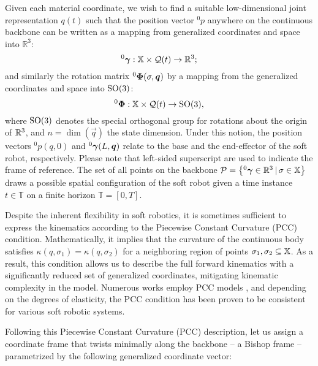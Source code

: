 {

Given each material coordinate, we wish to find a suitable low-dimensional joint representation $q(t)$ such that the position vector $^0p$ anywhere on the continuous backbone can be written as a mapping from generalized coordinates and space into $\mathbb{R}^3$:
%
\begin{equation}
^0{\boldsymbol{\gamma}}: \mathbb{X} \times \mathcal{Q}(t) \to \mathbb{R}^3;
\end{equation}
%
and similarly the rotation matrix $^0\boldsymbol{\Phi}(\sigma,\boldsymbol{q})$ by a mapping from the generalized coordinates and space into ${\text{SO}(3)}$:
%
\begin{equation}
^0{\boldsymbol{\Phi}}: \mathbb{X} \times \mathcal{Q}(t) \to {\text{SO}(3)}, \label{eq:phi_map}
\end{equation}
%
where {${\text{SO}(3)}$ denotes the special orthogonal group for rotations about the origin of $\mathbb{R}^3$}, and $n = \dim(\vec{q})$ the state dimension. Under this notion, the position vectors $^0p(q,0)$ and {$^0{\boldsymbol{\gamma}}(L,{\boldsymbol{q}})$} relate to the base and the end-effector of the soft robot, respectively. {Please note that left-sided superscript are used to indicate the frame of reference.} The set of all points on the backbone $\mathcal{P} = \left\{^0{\boldsymbol{\gamma}} \in \mathbb{R}^3\, |\, \sigma \in \mathbb{X} \right\}$ draws a possible {spatial} configuration of the soft robot given {a time instance $t \in \mathbb{T}$ on a finite horizon $\mathbb{T} = [0,T]$}.
%
\begin{intermez}
Despite the inherent flexibility in soft robotics, it is sometimes sufficient to express the kinematics according to the Piecewise Constant Curvature (PCC) condition. Mathematically, it implies that the curvature of the continuous body satisfies $\kappa(q,\sigma_1) = \kappa(q,\sigma_2)$ for a neighboring region of points $\sigma_1,\sigma_2 \subseteq \mathbb{X}$. As a result, this condition allows us to describe the full forward kinematics with a significantly reduced set of generalized coordinates, mitigating kinematic complexity in the model. Numerous works employ PCC models \cite{Falkenhahn2015,Katzschmann2019,Tatlicioglu2007,Marchese2016,Godage2016,Santina2020Pcc}, and depending on the degrees of elasticity, the PCC condition has been proven to be consistent for various soft robotic systems.
\end{intermez}
%
{Following this Piecewise Constant Curvature (PCC) description, let us assign a coordinate frame that twists minimally along the backbone -- a Bishop frame \cite{Bishop1975}-- parametrized by the following generalized coordinate vector:}
%
\begin{equation}

\end{equation}}
